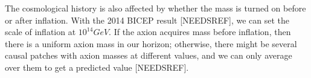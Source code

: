 \documentclass[12pt, twosides]{book}
\begin{document}
The cosmological history is also affected by whether the mass is turned on before or after inflation. With the 2014 BICEP result [NEEDSREF], we can set the scale of inflation at $10^{14} GeV$. If the axion acquires mass before inflation, then there is a uniform axion mass in our horizon; otherwise, there might be several causal patches with axion masses at different values, and we can only average over them to get a predicted value [NEEDSREF].



\end{document}
